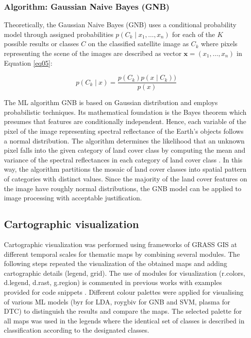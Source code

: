 \documentclass[sn-mathphys-num]{sn-jnl}%
\theoremstyle{thmstyleone}%
\theoremstyle{thmstyletwo}%
\theoremstyle{thmstylethree}%
\begin{document}
\subsubsection{Algorithm: Gaussian Naive Bayes (GNB)}
   
{Theoretically, the Gaussian Naive Bayes (GNB) uses a conditional probability model through assigned probabilities $p(C_{k}\mid x_{1},\ldots ,x_{n})$ for each of the $K$ possible results or classes $C$ on the classified satellite image as $C_{k}$ where pixels representing the scene of the images are described as vector $ \mathbf {x} =(x_{1},\ldots ,x_{n})$ in Equation} \ref{eq05}:

\begin{equation}\label{eq05}
	p(C_k \mid x) = \frac{p(C_{k})p(x \mid C_{k}))}{p(x)}
\end{equation}

{The ML algorithm GNB is based on Gaussian distribution and employs probabilistic techniques. Its mathematical foundation is the Bayes theorem which presumes that features are conditionally independent. Hence, each variable of the pixel of the image representing spectral reflectance of the Earth's objects follows a normal distribution. The algorithm determines the likelihood that an unknown pixel falls into the given category of land cover class by computing the mean and variance of the spectral reflectances in each category of land cover class} \cite{rs16122168,Lietal2022,Madhu}. {In this way, the algorithm partitions the  mosaic of land cover classes into spatial pattern of categories with distinct values. Since the majority of the land cover features on the image have roughly normal distributions, the GNB model can be applied to image processing with acceptable justification.}

\subsection{Cartographic visualization}
 
Cartographic visualization was performed using{ }frameworks of GRASS GIS at different temporal scales for thematic maps by combining {several modules}.{ }The following steps repeated the visualization of the obtained maps and adding cartographic details (legend, grid). { }The use of{ }modules {for} visualization (r.colors, d.legend, d.rast, g.region) is commented in previous works with examples provided for {code snippets} \cite{land12111995}. Different colour palettes were applied for visualising{ }of various ML models (byr for LDA, roygbiv for GNB and SVM, plasma for DTC){ to distinguish} the results and {compare the} maps. The selected palette for all maps was used in the legends where the identical set of classes is described in classification according to the designated classes.
\end{document}
